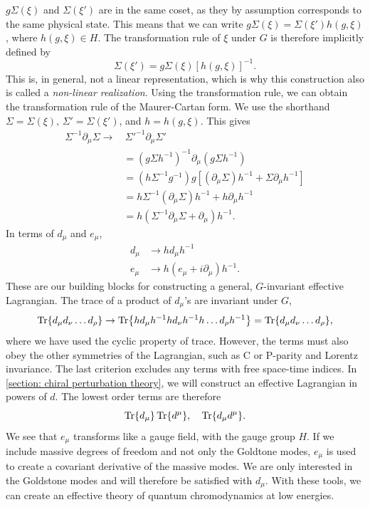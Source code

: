 $g\Sigma(\xi)$ and $\Sigma(\xi')$ are in the same coset, as they by assumption corresponds to the same physical state.
This means that we can write $g\Sigma(\xi) = \Sigma(\xi') h(g, \xi)$, where $h(g, \xi) \in H$.
The transformation rule of $\xi$ under $G$ is therefore implicitly defined by
\begin{equation}
    \Sigma(\xi') = g \Sigma(\xi) [h(g, \xi)]^{-1}.
\end{equation}
%
This is, in general, not a linear representation, which is why this construction also is called a \emph{non-linear realization}.
Using the transformation rule, we can obtain the transformation rule of the Maurer-Cartan form.
We use the shorthand $\Sigma = \Sigma(\xi),\, \Sigma' = \Sigma(\xi')$, and $h = h(g, \xi)$.
This gives
\begin{align*}
    \Sigma^{-1} \partial_\mu \Sigma
    \rightarrow 
    & \, \Sigma'^{-1} \partial_\mu \Sigma' \\
    & = (g \Sigma h^{-1})^{-1} \partial_\mu (g \Sigma h^{-1}) \\
    & = (h \Sigma^{-1} g^{-1}) g [(\partial_\mu \Sigma)h^{-1} + \Sigma \partial_\mu h^{-1}] \\
    & = h \Sigma^{-1} (\partial_\mu \Sigma) h^{-1}
    + h \partial_\mu h^{-1} \\
    & = h (\Sigma^{-1} \partial_\mu \Sigma + \partial_\mu) h^{-1}.
\end{align*}
In terms of $d_\mu$ and $e_\mu$,
\begin{align}
    d_\mu & \rightarrow h d_\mu h^{-1} \\
    e_\mu & \rightarrow h (e_\mu + i\partial_\mu )h^{-1}.
\end{align}
%
These are our building blocks for constructing a general, $G$-invariant effective Lagrangian.
The trace of a product of $d_\mu$'s are invariant under $G$,
\begin{equation}
    \Tr{d_\mu d_\nu \dots d_\rho} 
    \rightarrow
    \Tr{h d_\mu h^{-1} h d_\nu h^{-1} h \dots d_\rho h^{-1}}
    = \Tr{d_\mu d_\nu \dots d_\rho},
\end{equation}
%
where we have used the cyclic property of trace.
However, the terms must also obey the other symmetries of the Lagrangian, such as C or P-parity and Lorentz invariance.
The last criterion excludes any terms with free space-time indices.
In \autoref{section: chiral perturbation theory}, we will construct an effective Lagrangian in powers of $d$.
The lowest order terms are therefore
\begin{equation}
    \label{first order terms CCWZ}
    \Tr{d_\mu} \Tr{d^\mu}, 
    \quad 
    \Tr{d_\mu d^\mu}.
\end{equation}
%
We see that $e_\mu$ transforms like a gauge field, with the gauge group $H$.
If we include massive degrees of freedom and not only the Goldtone modes, $e_\mu$ is used to create a covariant derivative of the massive modes.
We are only interested in the Goldstone modes and will therefore be satisfied with $d_\mu$.
With these tools, we can create an effective theory of quantum chromodynamics at low energies.

